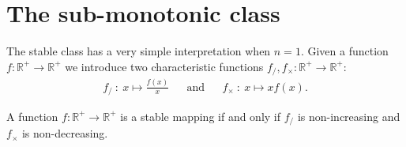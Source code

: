 \documentclass[a4papaer, titlepage]{book}
\begin{document}
\section{The sub-monotonic class}
The stable class has a very simple interpretation when $n=1$.
Given a function $f: \mathbb R^+ \rightarrow \mathbb R^+$ we introduce two characteristic functions $f_/,f_\times : \mathbb R^+ \rightarrow \mathbb R^+$:
\begin{align*}
    f_{/} \ : \ x \mapsto \frac{f(x)}{x} &
    &\text{and}&
    &f_{\times} \ : \ x \mapsto x f(x).
  \end{align*}
\begin{property}\label{prot:Caracterisation_stabilite_monotonie}
A function $f : \mathbb R^+ \rightarrow \mathbb R^+$ is a stable mapping if and only if $f_/ $ is non-increasing and $f_\times$ is non-decreasing.
\end{property}
\end{document}
